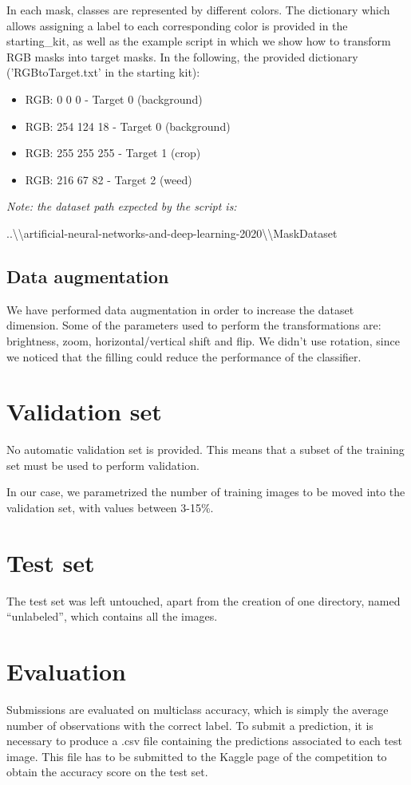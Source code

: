 \documentclass[12pt,a4paper]{report}
\begin{document}
In each mask, classes are represented by different colors. The dictionary which allows assigning a label to each corresponding color is provided in the starting\_kit, as well as the example script in which we show how to transform RGB masks into target masks. In the following, the provided dictionary ('RGBtoTarget.txt' in the starting kit):
			\begin{itemize}
				\item RGB: 0 0 0 - Target 0 (background)
				\item RGB: 254 124 18 - Target 0 (background)
				\item RGB: 255 255 255 - Target 1 (crop)
				\item RGB: 216 67 82 - Target 2 (weed)
			\end{itemize}

\textit{Note: the dataset path expected by the script is:}

 ..\textbackslash\textbackslash artificial-neural-networks-and-deep-learning-2020\textbackslash\textbackslash MaskDataset

	\subsection{Data augmentation}
We have performed data augmentation in order to increase the dataset dimension. Some of the parameters used to perform the transformations are: brightness, zoom, horizontal/vertical shift and flip.
We didn't use rotation, since we noticed that the filling could reduce the performance of the classifier.

	\section{Validation set}

No automatic validation set is provided. This means that a subset of the training set must be used to perform validation.

In our case, we parametrized the number of training images to be moved into the validation set, with values between 3-15\%.


	\section{Test set}
The test set was left untouched, apart from the creation of one directory, named ``unlabeled'', which contains all the images.
	\section{Evaluation}
Submissions are evaluated on multiclass accuracy, which is simply the average number of observations with the correct label.
To submit a prediction, it is necessary to produce a .csv file containing the predictions associated to each test image. This file has to be submitted to the Kaggle page of the competition to obtain the accuracy score on the test set.
\end{document}
